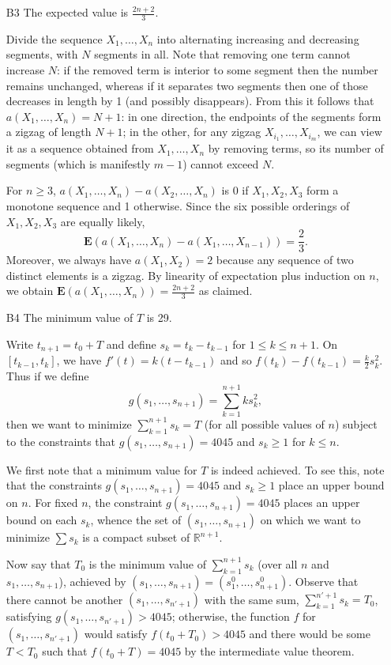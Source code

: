 \documentclass[amssymb,twocolumn,pra,10pt,aps]{revtex4-1}
\begin{document}
\begin{itemize}
\item[B3]
The expected value is $\frac{2n+2}{3}$.

Divide the sequence $X_1,\dots,X_n$ into alternating increasing and decreasing segments, with $N$ segments in all. Note that removing one term cannot increase $N$: if the removed term is interior to some segment then the number remains unchanged, whereas if it separates two segments then one of those decreases in length by 1 (and possibly disappears). From this it follows that $a(X_1,\dots,X_n) = N+1$: in one direction, the endpoints of the segments form a zigzag of length $N+1$; in the other, for any zigzag $X_{i_1},\dots, X_{i_m}$, we can view it as a sequence obtained from $X_1,\dots,X_n$ by removing terms, so its number of segments (which is manifestly $m-1$) cannot exceed $N$.

For $n \geq 3$, $a(X_1,\dots,X_n) - a(X_2,\dots,X_{n})$
is 0 if $X_1, X_2, X_3$ form a monotone sequence and 1 otherwise. Since the six possible orderings of $X_1,X_2,X_3$ are equally likely,
\[
\mathbf{E}(a(X_1,\dots,X_n) - a(X_1,\dots,X_{n-1})) = \frac{2}{3}.
\]
Moreover, we always have $a(X_1, X_2) = 2$ because any sequence of two distinct elements is a zigzag. By linearity of expectation plus induction on $n$, we obtain $\mathbf{E}(a(X_1,\dots,X_n)) = \frac{2n+2}{3}$ as claimed.

\item[B4]
The minimum value of $T$ is 29.

Write $t_{n+1} = t_0+T$ and define $s_k = t_k-t_{k-1}$ for $1\leq k\leq n+1$. On $[t_{k-1},t_k]$, we have $f'(t) = k(t-t_{k-1})$ and so $f(t_k)-f(t_{k-1}) = \frac{k}{2} s_k^2$. Thus if we define
\[
g(s_1,\ldots,s_{n+1}) = \sum_{k=1}^{n+1} ks_k^2,
\]
then we want to minimize $\sum_{k=1}^{n+1} s_k = T$ (for all possible values of $n$) subject to the constraints that $g(s_1,\ldots,s_{n+1}) = 4045$ and $s_k \geq 1$ for $k \leq n$.

We first note that a minimum value for $T$ is indeed achieved. To see this, note that the constraints $g(s_1,\ldots,s_{n+1}) = 4045$ and $s_k \geq 1$ place an upper bound on $n$. For fixed $n$, the constraint $g(s_1,\ldots,s_{n+1}) = 4045$ places an upper bound on each $s_k$, whence the set of $(s_1,\ldots,s_{n+1})$ on which we want to minimize $\sum s_k$ is a compact subset of $\mathbb{R}^{n+1}$.

Now say that $T_0$ is the minimum value of $\sum_{k=1}^{n+1} s_k$ (over all $n$ and $s_1,\ldots,s_{n+1}$), achieved by $(s_1,\ldots,s_{n+1}) = (s_1^0,\ldots,s_{n+1}^0)$. Observe that there cannot be another $(s_1,\ldots,s_{n'+1})$ with the same sum, $\sum_{k=1}^{n'+1} s_k = T_0$, satisfying $g(s_1,\ldots,s_{n'+1}) > 4045$; otherwise, the function $f$ for $(s_1,\ldots,s_{n'+1})$ would satisfy $f(t_0+T_0) > 4045$ and there would be some $T<T_0$ such that $f(t_0+T) = 4045$ by the intermediate value theorem.


\end{itemize}
\end{document}
